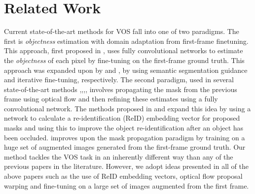 \documentclass[runningheads]{llncs}
\begin{document}
\section{Related Work}
Current state-of-the-art methods for VOS fall into one of two paradigms. The first is \textit{objectness} estimation with domain adaptation from first-frame finetuning. This approach, first proposed in \cite{caelles2017one}, uses fully convolutional networks to estimate the \textit{objectness} of each pixel by fine-tuning on the first-frame ground truth. 
This approach was expanded upon by \cite{maninis2017video} and \cite{voigtlaender17DAVIS},\cite{voigtlaender17BMVC} by using semantic segmentation guidance and iterative fine-tuning, respectively.
The second paradigm, used in several state-of-the-art methods \cite{Perazzi2017CVPR},\cite{li2017video},\cite{khoreva2017lucid},\cite{li2018video}, involves propagating the mask from the previous frame using optical flow and then refining these estimates using a fully convolutional network. The methods proposed in \cite{li2017video} and \cite{li2018video} expand this idea by using a network to calculate a re-identification (ReID) embedding vector for proposed masks and using this to improve the object re-identification after an object has been occluded. \cite{khoreva2017lucid} improves upon the mask propagation paradigm by training on a huge set of augmented images generated from the first-frame ground truth.
Our method tackles the VOS task in an inherently different way than any of the previous papers in the literature. However, we adopt ideas presented in all of the above papers such as the use of ReID embedding vectors, optical flow proposal warping and fine-tuning on a large set of images augmented from the first frame.
\end{document}
